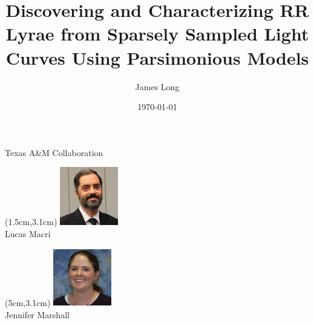 \documentclass[12pt]{beamer}
\title{Discovering and Characterizing RR Lyrae from Sparsely Sampled Light Curves Using Parsimonious Models}
\author{James Long}
\date{\today}
\newcommand{\w}{1in}
\newcommand{\h}{1in}
\begin{document}
\frame{\titlepage}

\frame{\tableofcontents}





\begin{frame}{Texas A\&M Collaboration}



  \begin{textblock*}{3cm}(1.5cm,3.1cm) %
\includegraphics[width=\w,height=\h]{figs/Macri.jpg}\\
Lucas Macri
\end{textblock*}


  \begin{textblock*}{3cm}(5cm,3.1cm) %
\includegraphics[width=\w,height=\h]{figs/marshall.jpg}\\
Jennifer Marshall
\end{textblock*}


\end{frame}
\end{document}
